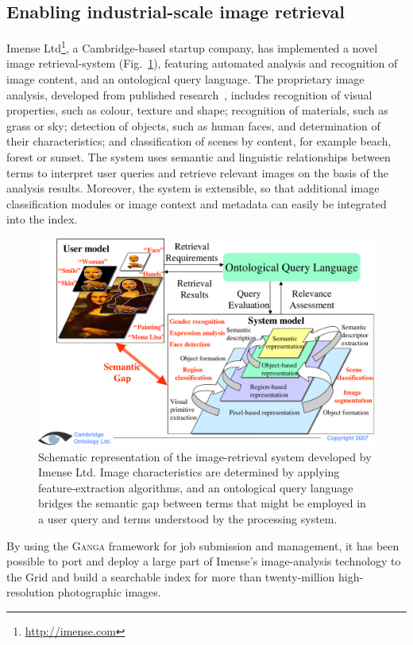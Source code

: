 \documentclass{elsart}
\def\ganga {\textsc{Ganga}\xspace}
\def\grid {Grid\xspace}
\begin{document}
\subsection{Enabling industrial-scale image retrieval}
\label{sec:Imense}
Imense Ltd\footnote{\url{http://imense.com}}, a Cambridge-based startup
company, has implemented a novel image retrieval-system
(Fig.~\ref{fig:camtologytech}), featuring automated analysis
and recognition of image content, and an ontological query language. The
proprietary image analysis, developed from published research~\cite{town_2004},
includes recognition of visual properties, such as colour, texture
and shape; recognition of materials, such as grass or sky; detection of
objects, such as human faces, and determination of their characteristics; and
classification of scenes by content, for example beach, forest or
sunset.  The system uses semantic and linguistic relationships between terms to
interpret user queries and retrieve relevant images on the basis of the
analysis results. Moreover, the system is extensible, so that
additional image classification modules or image context and metadata can
easily be integrated into the index.
\begin{figure}[htb]
  \begin{center}
    \includegraphics[width=0.85 \textwidth]{camtologyfigure.pdf}
  \end{center}
  \caption{Schematic representation of the image-retrieval system developed by
Imense Ltd. Image characteristics are determined by applying feature-extraction
algorithms, and an ontological query language bridges the semantic gap between
terms that might be employed in a user query and terms understood by
the processing system.}
  \label{fig:camtologytech}
\end{figure}

By using the \ganga framework for job submission and management, it has been
possible to port and deploy a large part of Imense's image-analysis technology
to the \grid and build a searchable index for more than
twenty-million high-resolution photographic images.
\end{document}
